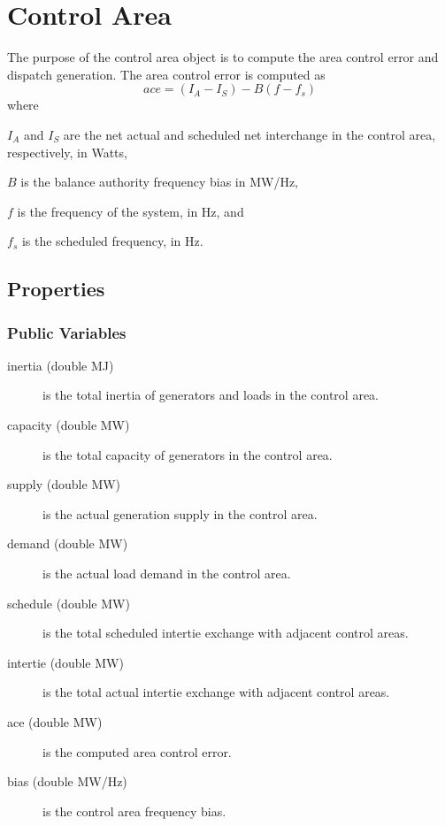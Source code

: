\chapter{Control Area}

The purpose of the control area object is to compute the area control error and dispatch generation.  The area control error is computed as \cite{nerc2011}
\begin{equation}
	ace = (I_A - I_S) - B ( f - f_s)
\end{equation}
where
\begin{description}

\item $I_A$ and $I_S$ are the net actual and scheduled net interchange in the control area, respectively, in Watts,

\item $B$ is the balance authority frequency bias in MW/Hz,

\item $f$ is the frequency of the system, in Hz, and

\item $f_s$ is the scheduled frequency, in Hz.

\end{description}

\section{Properties}


\subsection{Public Variables}

\begin{description}

\item[inertia (double MJ)] is the total inertia of generators and loads in the control area.
\item[capacity (double MW)] is the total capacity of generators in the control area.
\item[supply (double MW)] is the actual generation supply in the control area.
\item[demand (double MW)] is the actual load demand in the control area.
\item[schedule (double MW)] is the total scheduled intertie exchange with adjacent control areas.
\item[intertie (double MW)] is the total actual intertie exchange with adjacent control areas.
\item[ace (double MW)] is the computed area control error.
\item[bias (double MW/Hz)] is the control area frequency bias.

\end{description}

